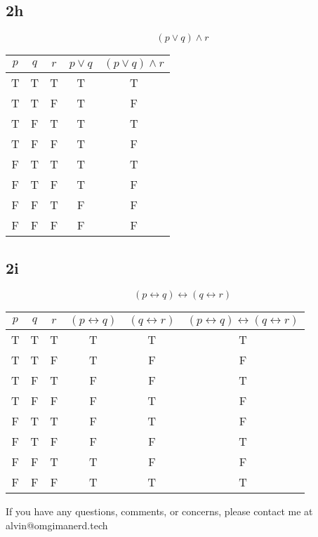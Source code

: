 \documentclass[letterpaper, 12pt]{math}
\begin{document}
\subsection*{2h}
\[ (p \vee q) \wedge r \]
\begin{center}
  \begin{tabular}{|c|c|c|c|c|}
    \hline
    \( p \) & \( q \) & \( r \) & \( p \vee q \) & \( (p \vee q) \wedge r \)
        \\ \hline
    T & T & T & T & T \\ \hline
    T & T & F & T & F \\ \hline
    T & F & T & T & T \\ \hline
    T & F & F & T & F \\ \hline
    F & T & T & T & T \\ \hline
    F & T & F & T & F \\ \hline
    F & F & T & F & F \\ \hline
    F & F & F & F & F \\ \hline
  \end{tabular}
\end{center}

\subsection*{2i}
\[ (p \leftrightarrow q) \leftrightarrow (q \leftrightarrow r) \]
\begin{center}
  \begin{tabular}{|c|c|c|c|c|c|}
    \hline
    \( p \) & \( q \) & \( r \) & \( (p \leftrightarrow q) \) &
    \( (q \leftrightarrow r) \) &
    \( (p \leftrightarrow q) \leftrightarrow (q \leftrightarrow r) \) \\ \hline
    T & T & T & T & T & T \\ \hline
    T & T & F & T & F & F \\ \hline
    T & F & T & F & F & T \\ \hline
    T & F & F & F & T & F \\ \hline
    F & T & T & F & T & F \\ \hline
    F & T & F & F & F & T \\ \hline
    F & F & T & T & F & F \\ \hline
    F & F & F & T & T & T \\ \hline
  \end{tabular}
\end{center}

\begin{center}
  If you have any questions, comments, or concerns, please contact me at
  alvin@omgimanerd.tech
\end{center}
\end{document}
